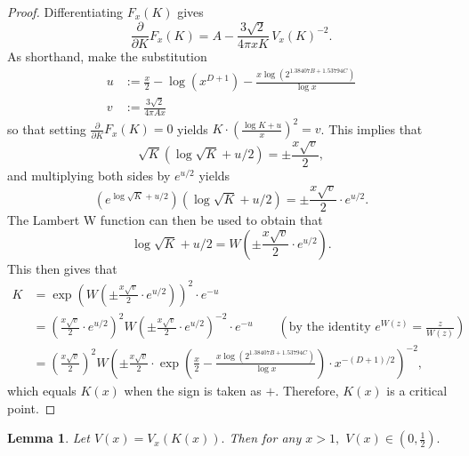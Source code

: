 \documentclass[11pt,letterpaper,reqno]{amsart}
\newtheorem{lemma}[theorem]{Lemma}
\theoremstyle{definition}
\numberwithin{equation}{section}
\numberwithin{figure}{section}
\numberwithin{table}{section}
\begin{document}
\begin{proof}
    Differentiating $F_x(K)$ gives
    \begin{equation}
        \frac{\partial }{\partial K} F_x(K) = A - \frac{3\sqrt{2}}{4\pi x K} \, V_x(K)^{-2}. \label{eqn:derivative-of-T}
    \end{equation}
    As shorthand, make the substitution
    \begin{align*}
            u &:= \frac{x}{2} - \log\left( x^{D + 1} \right) - \frac{x\log \left( 2^{1.38407B +  1.53794C}  \right)}{\log x}\\
            v &:= \frac{3\sqrt{2}}{4\pi A x}
        \end{align*}
    so that setting $\frac{\partial }{\partial K} F_x(K) = 0$ yields $K \cdot \left( \frac{\log K + u}{x} \right)^{2} = v$. This implies that
        $$\sqrt{K} \left( \log \sqrt{K} + u/2 \right) = \pm \frac{x \sqrt{v}}{2},$$
        and multiplying both sides by $e^{u/2}$ yields
        $$\left( e^{\log \sqrt{K} + u/2}  \right) \left( \log \sqrt{K} + u/2 \right) = \pm \frac{x\sqrt{v}}{2} \cdot e^{u/2}.$$
        The Lambert W function can then be used to obtain that
        $$\log \sqrt{K} + u/2 = W\left( \pm \frac{x\sqrt{v}}{2} \cdot e^{u/2} \right).$$
        This then gives that
        \begin{align*}
            K &= \exp\left(W\left( \pm \frac{x\sqrt{v}}{2} \cdot e^{u/2} \right)  \right)^2 \cdot e^{-u}\\
            &= \left( \frac{x\sqrt{v}}{2} \cdot e^{u/2}  \right)^2 W\left( \pm \frac{x\sqrt{v}}{2} \cdot e^{u/2} \right)^{-2} \cdot e^{-u}   \qquad \left( \text{by the identity $e^{W(z)} = \frac{z}{W(z)}$} \right)\\
            &= \left( \frac{x\sqrt{v}}{2} \right)^2W\left( \pm \frac{x\sqrt{v}}{2} \cdot \exp\left( \frac{x}{2} - \frac{x \log \left( 2^{1.38407 B + 1.53794 C}   \right)}{\log x}  \right) \cdot x^{-(D + 1)/2} \right)^{-2},
        \end{align*}
        which equals $K(x)$ when the sign is taken as $+.$ Therefore, $K(x)$ is a critical point.
\end{proof}

\begin{lemma}\label{lem:V(x)-in-proper-range}
    Let $V(x) = V_x(K(x)).$ Then for any $x > 1,$ $V(x) \in \left(0, \frac{1}{2} \right).$
\end{lemma}
\end{document}
